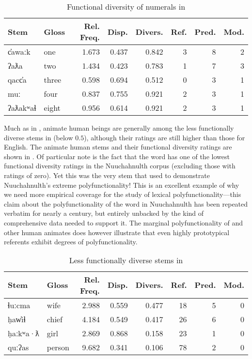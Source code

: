 \begin{table}[h!]
  \centering
  \caption{Functional diversity of numerals in }
  \label{tab:Nuuchahnulth-numerals}
  \begin{tabular}{ l l r r r r r r }
    \toprule
    Stem & Gloss & Rel. Freq. & Disp. & Divers. & Ref. & Pred. & Mod.\\
    \midrule
    c̓awaːk   & one   & 1.673 & 0.437 & 0.842 & 3 & 8 & 2\\
    ʔaƛa     & two   & 1.434 & 0.423 & 0.783 & 1 & 7 & 3\\
    qacc̓a    & three & 0.598 & 0.694 & 0.512 & 0 & 3 & 1\\
    muː      & four  & 0.837 & 0.755 & 0.921 & 2 & 3 & 1\\
    ʔaƛakʷaɬ & eight & 0.956 & 0.614 & 0.921 & 2 & 3 & 1\\
    \bottomrule
  \end{tabular}
\end{table}

Much as in , animate human beings are generally among the less functionally diverse stems in  (below $0.5$), although their ratings are still higher than those for English. The animate human stems and their functional diversity ratings are shown in . Of particular note is the fact that the word   has one of the lowest functional diversity ratings in the Nuuchahnulth corpus (excluding those with ratings of zero). Yet this was the very stem that \textcite{Swadesh1939b} used to demonstrate Nuuchahnulth's extreme polyfunctionality! This is an excellent example of why we need more empirical coverage for the study of lexical polyfunctionality—this claim about the polyfunctionality of the word  in Nuuchahnulth has been repeated verbatim for nearly a century, but entirely unbacked by the kind of comprehensive data needed to support it. The marginal polyfunctionality of  and other human animates does however illustrate that even highly prototypical referents exhibit degrees of polyfunctionality.

\begin{table}
  \centering
  \caption{Less functionally diverse stems in }
  \label{tab:Nuuchahnulth-low-functional-diversity}
  \begin{tabular}{ l l r r r r r r }
    \toprule
    Stem     & Gloss  & Rel. Freq. & Disp. & Divers. & Ref. & Pred. & Mod.\\
    \midrule
    ɬuːcma   & wife   & 2.988      & 0.559 & 0.477 & 18   & 5     & 0  \\
    ḥaw̓iɬ    & chief  & 4.184      & 0.549 & 0.417 & 26   & 6     & 0  \\
    ḥaːkʷa·ƛ & girl   & 2.869      & 0.868 & 0.158 & 23   & 1     & 0  \\
    quːʔas   & person & 9.682      & 0.341 & 0.106 & 78   & 2     & 0  \\
    \bottomrule
  \end{tabular}
\end{table}

